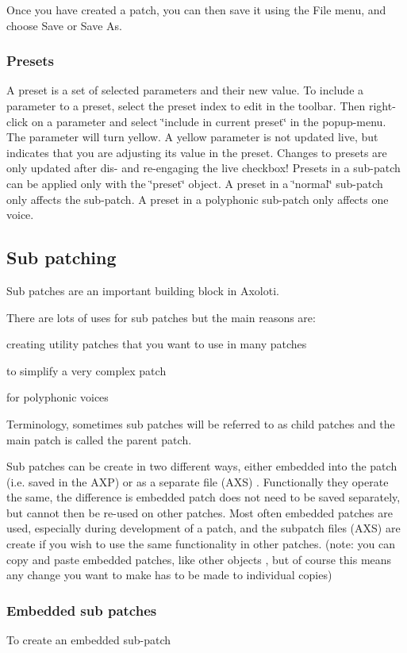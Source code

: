 Once you have created a patch, you can then save it using the File menu, and choose Save or Save As. \hypertarget{axo_gui_axo_gui_axoloti_edit_mode_patch_presets}{}\subsubsection{Presets}\label{axo_gui_axo_gui_axoloti_edit_mode_patch_presets}
A preset is a set of selected parameters and their new value. To include a parameter to a preset, select the preset index to edit in the toolbar. Then right-\/click on a parameter and select \char`\"{}include in current preset\char`\"{} in the popup-\/menu. The parameter will turn yellow. A yellow parameter is not updated live, but indicates that you are adjusting its value in the preset. Changes to presets are only updated after dis-\/ and re-\/engaging the live checkbox! Presets in a sub-\/patch can be applied only with the \char`\"{}preset\char`\"{} object. A preset in a \char`\"{}normal\char`\"{} sub-\/patch only affects the sub-\/patch. A preset in a polyphonic sub-\/patch only affects one voice.\hypertarget{axo_gui_axo_gui_axoloti_edit_mode_patch_subpatch}{}\subsection{Sub patching}\label{axo_gui_axo_gui_axoloti_edit_mode_patch_subpatch}
Sub patches are an important building block in Axoloti.

There are lots of uses for sub patches but the main reasons are\+:


\begin{DoxyItemize}
\item creating \textquotesingle{}utility\textquotesingle{} patches that you want to use in many patches 
\item to simplify a very complex patch 
\item for polyphonic voices  
\end{DoxyItemize}

Terminology, sometimes sub patches will be referred to as \textquotesingle{}child patches\textquotesingle{} and the main patch is called the parent patch.

Sub patches can be create in two different ways, either embedded into the patch (i.\+e. saved in the A\+XP) or as a separate file (A\+XS) . Functionally they operate the same, the difference is embedded patch does not need to be saved separately, but cannot then be re-\/used on other patches. Most often embedded patches are used, especially during \textquotesingle{}development\textquotesingle{} of a patch, and the subpatch files (A\+XS) are create if you wish to use the same functionality in other patches. (note\+: you can copy and paste embedded patches, like other objects , but of course this means any change you want to make has to be made to individual copies)\hypertarget{axo_gui_axo_gui_axoloti_edit_mode_patch_subpatch_embedded}{}\subsubsection{Embedded sub patches}\label{axo_gui_axo_gui_axoloti_edit_mode_patch_subpatch_embedded}
To create an embedded sub-\/patch 


